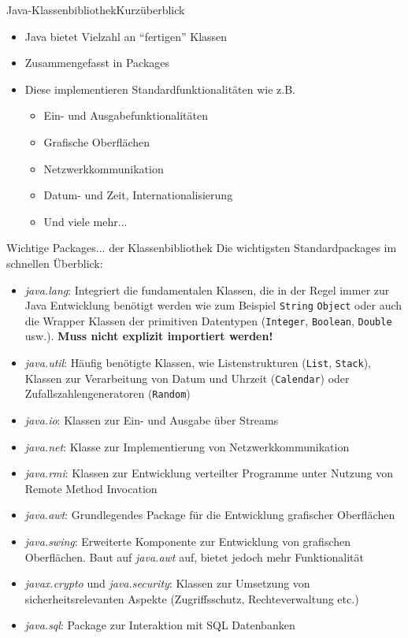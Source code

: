 \begin{frame}{Java-Klassenbibliothek}{Kurzüberblick}
	\begin{itemize}
		\item Java bietet Vielzahl an "`fertigen"' Klassen
		\item Zusammengefasst in Packages
		\item Diese implementieren Standardfunktionalitäten wie z.B.
		\begin{itemize}
			\item Ein- und Ausgabefunktionalitäten
			\item Grafische Oberflächen
			\item Netzwerkkommunikation
			\item Datum- und Zeit, Internationalisierung
			\item Und viele mehr...
		\end{itemize}
	\end{itemize}
\end{frame}

\begin{frame}[allowframebreaks]{Wichtige Packages}{... der Klassenbibliothek}
Die wichtigsten Standardpackages im schnellen Überblick:
	\begin{itemize}
		\item \textit{java.lang}: Integriert die fundamentalen Klassen, die in der Regel immer zur Java Entwicklung benötigt werden wie zum Beispiel \texttt{String} \texttt{Object} oder auch die Wrapper Klassen der primitiven
		Datentypen (\texttt{Integer}, \texttt{Boolean}, \texttt{Double} usw.). \textbf{Muss nicht explizit importiert werden!}
		\item \textit{java.util}: Häufig benötigte Klassen, wie Listenstrukturen (\texttt{List}, \texttt{Stack}), Klassen zur Verarbeitung von Datum und Uhrzeit (\texttt{Calendar}) oder Zufallszahlengeneratoren (\texttt{Random})
		\item \textit{java.io}: Klassen zur Ein- und Ausgabe über Streams
		\item \textit{java.net}: Klasse zur Implementierung von Netzwerkkommunikation
		\item \textit{java.rmi}: Klassen zur Entwicklung verteilter Programme unter Nutzung von Remote Method Invocation
		\item \textit{java.awt}: Grundlegendes Package für die Entwicklung grafischer Oberflächen
		\item \textit{java.swing}: Erweiterte Komponente zur Entwicklung von grafischen Oberflächen. Baut auf \textit{java.awt} auf, bietet jedoch mehr Funktionalität
		\item \textit{javax.crypto} und \textit{java.security}: Klassen zur Umsetzung von sicherheitsrelevanten Aspekte (Zugriffsschutz, Rechteverwaltung etc.)
		\item \textit{java.sql}: Package zur Interaktion mit SQL Datenbanken
	\end{itemize}
\end{frame}

